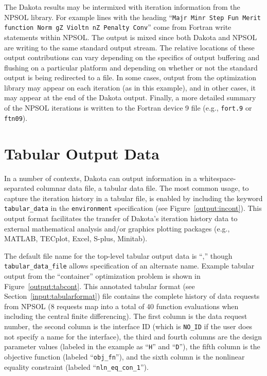 The Dakota results may be intermixed with iteration information from
the NPSOL library. For example lines with the heading ``\texttt{Majr
  Minr Step Fun Merit function Norm gZ Violtn nZ Penalty Conv}'' come
from Fortran write statements within NPSOL. The output is mixed since
both Dakota and NPSOL are writing to the same standard output
stream. The relative locations of these output contributions can vary
depending on the specifics of output buffering and flushing on a
particular platform and depending on whether or not the standard
output is being redirected to a file. In some cases, output from the
optimization library may appear on each iteration (as in this
example), and in other cases, it may appear at the end of the Dakota
output. Finally, a more detailed summary of the NPSOL iterations is
written to the Fortran device 9 file (e.g., \texttt{fort.9} or
\texttt{ftn09}).

\section{Tabular Output Data}\label{output:tabular}

In a number of contexts, Dakota can output information in a
whitespace-separated columnar data file, a tabular data file.  The
most common usage, to capture the iteration history in a tabular file,
is enabled by including the keyword \texttt{tabular\_data} in the
\texttt{environment} specification (see
Figure~\ref{output:incont}). This output format facilitates the
transfer of Dakota's iteration history data to external mathematical
analysis and/or graphics plotting packages (e.g., MATLAB, TECplot,
Excel, S-plus, Minitab).

The default file name for the top-level tabular output data is
``,'' though \texttt{tabular\_data\_file}
allows specification of an alternate name.  Example tabular output
from the ``container'' optimization problem is shown in
Figure~\ref{output:tabcont}. This annotated tabular format (see
Section~\ref{input:tabularformat}) file contains the complete history
of data requests from NPSOL (8 requests map into a total of 40
function evaluations when including the central finite
differencing). The first column is the data request number, the second
column is the interface ID (which is \texttt{NO\_ID} if the user does
not specify a name for the interface), the third and fourth columns
are the design parameter values (labeled in the example as
``\texttt{H}'' and ``\texttt{D}''), the fifth column is the objective
function (labeled ``\texttt{obj\_fn}''), and the sixth column is the
nonlinear equality constraint (labeled ``\texttt{nln\_eq\_con\_1}'').


